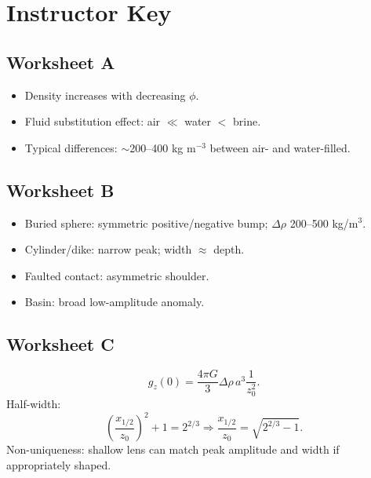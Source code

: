 \documentclass[11pt,a4paper]{article}
\begin{document}
\section*{Instructor Key}

\subsection*{Worksheet A}
\begin{itemize}
  \item Density increases with decreasing $\phi$.
  \item Fluid substitution effect: air $\ll$ water $<$ brine.
  \item Typical differences: $\sim$200--400 kg m$^{-3}$ between air- and water-filled.
\end{itemize}

\subsection*{Worksheet B}
\begin{itemize}
  \item Buried sphere: symmetric positive/negative bump; $\Delta\rho$ 200--500 kg/m$^3$.
  \item Cylinder/dike: narrow peak; width $\approx$ depth.
  \item Faulted contact: asymmetric shoulder.
  \item Basin: broad low-amplitude anomaly.
\end{itemize}

\subsection*{Worksheet C}
\[
  g_z(0) = \frac{4\pi G}{3}\Delta\rho\, a^3 \frac{1}{z_0^2}.
\]
Half-width:
\[
  \left(\frac{x_{1/2}}{z_0}\right)^2 + 1 = 2^{2/3}
\Rightarrow
  \frac{x_{1/2}}{z_0} = \sqrt{2^{2/3}-1}.
\]
Non-uniqueness: shallow lens can match peak amplitude and width if appropriately shaped.
\end{document}
